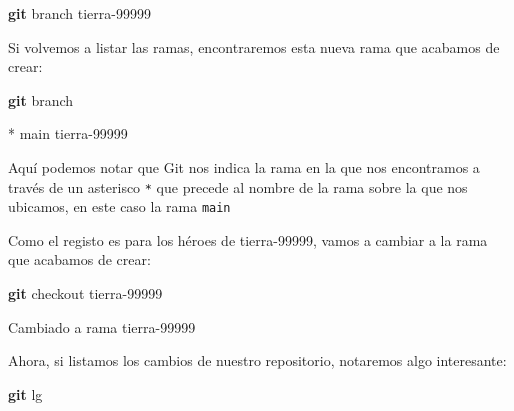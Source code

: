\documentclass[
]{book}
\newenvironment{Shaded}{\begin{snugshade}}{\end{snugshade}}
\newcommand{\ExtensionTok}[1]{#1}
\newcommand{\FunctionTok}[1]{\textcolor[rgb]{0.13,0.29,0.53}{\textbf{#1}}}
\newcommand{\NormalTok}[1]{#1}
\newcommand{\StringTok}[1]{\textcolor[rgb]{0.31,0.60,0.02}{#1}}
\begin{document}
\begin{Shaded}
\begin{Highlighting}[]
\FunctionTok{git}\NormalTok{ branch tierra{-}99999}
\end{Highlighting}
\end{Shaded}

Si volvemos a listar las ramas, encontraremos esta nueva rama que acabamos de crear:

\begin{Shaded}
\begin{Highlighting}[]
\FunctionTok{git}\NormalTok{ branch}
\end{Highlighting}
\end{Shaded}

\begin{Shaded}
\begin{Highlighting}[]
\ExtensionTok{*}\NormalTok{ main}
  \ExtensionTok{tierra{-}99999}
\end{Highlighting}
\end{Shaded}

Aquí podemos notar que Git nos indica la rama en la que nos encontramos a través de un asterisco \texttt{*} que precede al nombre de la rama sobre la que nos ubicamos, en este caso la rama \texttt{main}

Como el registo es para los héroes de tierra-99999, vamos a cambiar a la rama que acabamos de crear:

\begin{Shaded}
\begin{Highlighting}[]
\FunctionTok{git}\NormalTok{ checkout tierra{-}99999}
\end{Highlighting}
\end{Shaded}

\begin{Shaded}
\begin{Highlighting}[]
\ExtensionTok{Cambiado}\NormalTok{ a rama }\StringTok{\textquotesingle{}tierra{-}99999\textquotesingle{}}
\end{Highlighting}
\end{Shaded}

Ahora, si listamos los cambios de nuestro repositorio, notaremos algo interesante:

\begin{Shaded}
\begin{Highlighting}[]
\FunctionTok{git}\NormalTok{ lg}
\end{Highlighting}
\end{Shaded}
\end{document}
